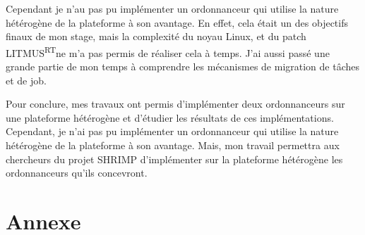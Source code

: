 \documentclass{article}
\newcommand{\litmus}{LITMUS\textsuperscript{RT}}
\begin{document}
    Cependant je n'au pas pu implémenter un ordonnanceur qui utilise la nature hétérogène de la plateforme à son avantage. En effet, cela était un des objectifs finaux de mon stage, mais la complexité du noyau Linux, et du patch \litmus ne m'a pas permis de réaliser cela à temps. J'ai aussi passé une grande partie de mon temps à comprendre les mécanismes de migration de tâches et de job.

    Pour conclure, mes travaux ont permis d'implémenter deux ordonnanceurs sur une plateforme hétérogène et d'étudier les résultats de ces implémentations. Cependant, je n'ai pas pu implémenter un ordonnanceur qui utilise la nature hétérogène de la plateforme à son avantage. Mais, mon travail permettra aux chercheurs du projet SHRIMP d'implémenter sur la plateforme hétérogène les ordonnanceurs qu'ils concevront.
     

    \newpage

    \newpage
    \printnoidxglossaries %

    \newpage
    \listoffigures
    \lstlistoflistings



    \newpage
    \section*{Annexe}
    


    
\end{document}
